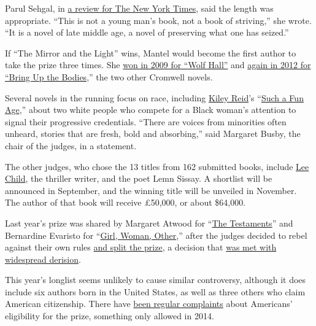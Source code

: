 Parul Sehgal, in
\href{https://www.nytimes3xbfgragh.onion/2020/03/03/books/review-mirror-light-hilary-mantel.html}{a
review for The New York Times}, said the length was appropriate. ``This
is not a young man's book, not a book of striving,'' she wrote. ``It is
a novel of late middle age, a novel of preserving what one has seized.''

If ``The Mirror and the Light'' wins, Mantel would become the first
author to take the prize three times. She
\href{https://www.nytimes3xbfgragh.onion/2009/10/07/books/07booker.html}{won
in 2009 for ``Wolf Hall''} and
\href{https://artsbeat.blogs.nytimes3xbfgragh.onion/2012/10/16/hilary-mantel-wins-a-second-booker-prize/}{again
in 2012 for ``Bring Up the Bodies},'' the two other Cromwell novels.

Several novels in the running focus on race, including
\href{https://www.nytimes3xbfgragh.onion/2020/01/09/books/review/inside-the-list-kiley-reid.html}{Kiley
Reid}'s
``\href{https://www.nytimes3xbfgragh.onion/2019/12/31/books/review/such-a-fun-age-kiley-reid.html}{Such
a Fun Age},'' about two white people who compete for a Black woman's
attention to signal their progressive credentials. ``There are voices
from minorities often unheard, stories that are fresh, bold and
absorbing,'' said Margaret Busby, the chair of the judges, in a
statement.

The other judges, who chose the 13 titles from 162 submitted books,
include
\href{https://www.nytimes3xbfgragh.onion/2019/10/23/books/jack-reacher-lee-child-wyoming.html}{Lee
Child}, the thriller writer, and the poet Lemn Sissay. A shortlist will
be announced in September, and the winning title will be unveiled in
November. The author of that book will receive £50,000, or about
\$64,000.

Last year's prize was shared by Margaret Atwood for
``\href{https://www.nytimes3xbfgragh.onion/2019/09/03/books/review/testaments-margaret-atwood-handmaids-tale.html}{The
Testaments}'' and Bernardine Evaristo for
``\href{https://www.nytimes3xbfgragh.onion/2019/11/04/books/review-girl-woman-other-bernardine-evaristo.html}{Girl,
Woman, Other},'' after the judges decided to rebel against their own
rules
\href{https://www.nytimes3xbfgragh.onion/2019/10/14/books/booker-prize-winner-atwood-evaristo.html}{and
split the prize}, a decision that
\href{https://www.theguardian.com/books/2019/oct/15/bernardine-evaristo-margaret-atwood-share-booker-prize-award}{was
met with widespread derision}.

This year's longlist seems unlikely to cause similar controversy,
although it does include six authors born in the United States, as well
as three others who claim American citizenship. There have
\href{https://www.nytimes3xbfgragh.onion/2019/07/23/books/booker-longlist-margaret-atwood.html}{been
regular complaints} about Americans' eligibility for the prize,
something only allowed in 2014.

